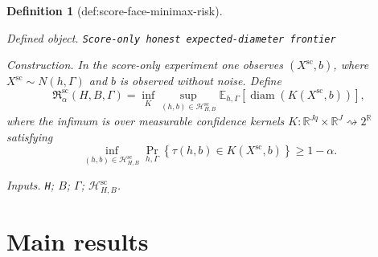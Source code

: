 \documentclass{article}
\newtheorem{definition}{Definition}
\begin{document}
\begin{definition}[def:score-face-minimax-risk]\label{def:score-face-minimax-risk}
\par\smallskip\noindent\emph{Defined object.} \texttt{Score-\allowbreak{}only honest expected-\allowbreak{}diameter frontier}
\par\smallskip\noindent\emph{Construction.} In the score-only experiment one observes \((X^{\mathrm{sc}},b)\), where \(X^{\mathrm{sc}}\sim N(h,\Gamma)\) and \(b\) is observed without noise. Define
\[
 \mathfrak R_{\alpha}^{\mathrm{sc}}(H,B,\Gamma)
 =\inf_K\sup_{(h,b)\in\mathcal H_{H,B}^{\mathrm{sc}}}
 \mathbb E_{h,\Gamma}
 \left[\operatorname{diam}(K(X^{\mathrm{sc}},b))\right],
\]
where the infimum is over measurable confidence kernels
\(K:\mathbb R^{Jq}\times\mathbb R^J\rightsquigarrow2^{\mathbb R}\) satisfying
\[
 \inf_{(h,b)\in\mathcal H_{H,B}^{\mathrm{sc}}}
 \Pr_{h,\Gamma}\!\left\{\tau(h,b)\in K(X^{\mathrm{sc}},b)\right\}
 \geq1-\alpha.
\]
\par\smallskip\noindent\emph{Inputs.} \texttt{H}; \(B\); \(\Gamma\); \(\mathcal H_{H,B}^{\mathrm{sc}}\).
\end{definition}

\section{Main results}
\end{document}
